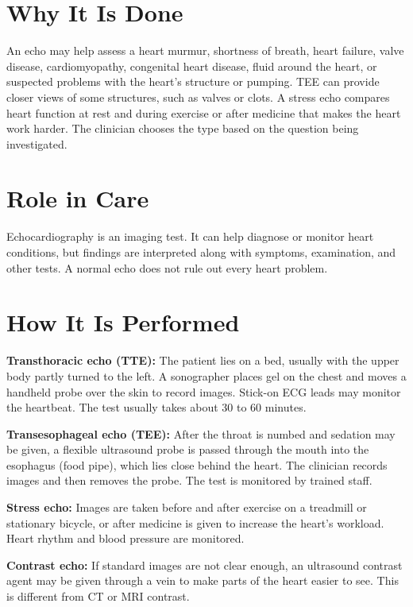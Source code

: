 \section*{Why It Is Done}
An echo may help assess a heart murmur, shortness of breath, heart failure, valve disease, cardiomyopathy, congenital heart disease, fluid around the heart, or suspected problems with the heart's structure or pumping. TEE can provide closer views of some structures, such as valves or clots. A stress echo compares heart function at rest and during exercise or after medicine that makes the heart work harder. The clinician chooses the type based on the question being investigated.

\section*{Role in Care}
Echocardiography is an imaging test. It can help diagnose or monitor heart conditions, but findings are interpreted along with symptoms, examination, and other tests. A normal echo does not rule out every heart problem.

\section*{How It Is Performed}
\textbf{Transthoracic echo (TTE):} The patient lies on a bed, usually with the upper body partly turned to the left. A sonographer places gel on the chest and moves a handheld probe over the skin to record images. Stick-on ECG leads may monitor the heartbeat. The test usually takes about 30 to 60 minutes.

\textbf{Transesophageal echo (TEE):} After the throat is numbed and sedation may be given, a flexible ultrasound probe is passed through the mouth into the esophagus (food pipe), which lies close behind the heart. The clinician records images and then removes the probe. The test is monitored by trained staff.

\textbf{Stress echo:} Images are taken before and after exercise on a treadmill or stationary bicycle, or after medicine is given to increase the heart's workload. Heart rhythm and blood pressure are monitored.

\textbf{Contrast echo:} If standard images are not clear enough, an ultrasound contrast agent may be given through a vein to make parts of the heart easier to see. This is different from CT or MRI contrast.

